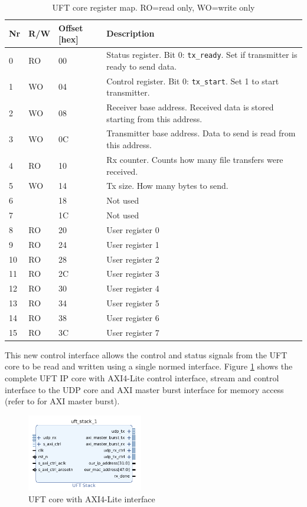 \begin{table}[tb!]
    \centering
    \begin{tabular}{l l l p{10cm}}
        \toprule
		Nr & R/W & Offset [hex] & Description \\
        \midrule
		0 & RO & 00 & Status register. Bit 0: \texttt{tx\_ready}. Set if transmitter is
		ready to send data. \\
		1 & WO & 04 & Control register. Bit 0: \texttt{tx\_start}. Set 1 to start
		transmitter. \\
		2 & WO & 08 & Receiver base address. Received data is stored starting from this
		address. \\
		3 & WO & 0C & Transmitter base address. Data to send is read from this address.
		\\
		4 & RO & 10 & Rx counter. Counts how many file transfers were received. \\
		5 & WO & 14 & Tx size. How many bytes to send. \\
		6 & & 18 &  Not used\\
		7 & & 1C &  Not used\\
		8 & RO & 20 & User register 0 \\
		9 & RO & 24 & User register 1 \\
		10 & RO & 28 & User register 2 \\
		11 & RO & 2C & User register 3 \\
		12 & RO & 30 & User register 4 \\
		13 & RO & 34 & User register 5 \\
		14 & RO & 38 & User register 6 \\
		15 & RO & 3C & User register 7 \\
        \bottomrule
    \end{tabular}
    \caption{UFT core register map. RO=read only, WO=write only}
    \label{tab:uftaxiregmap}
\end{table}

This new control interface allows the control and status signals from the UFT
core to be read and written using a single normed interface. Figure 
\ref{fig:uftcoreaxilite} shows the complete UFT IP core with AXI4-Lite control
interface, stream and control interface to the UDP core and AXI master burst
interface for memory access (refer to \cite{p5report} for AXI master burst).

\begin{figure}[b!]
    \centering
    \includegraphics[width=0.45\textwidth] {images/dataflow/uftcoreaxilite.png}
    \caption{UFT core with AXI4-Lite interface}
    \label{fig:uftcoreaxilite}
\end{figure}

